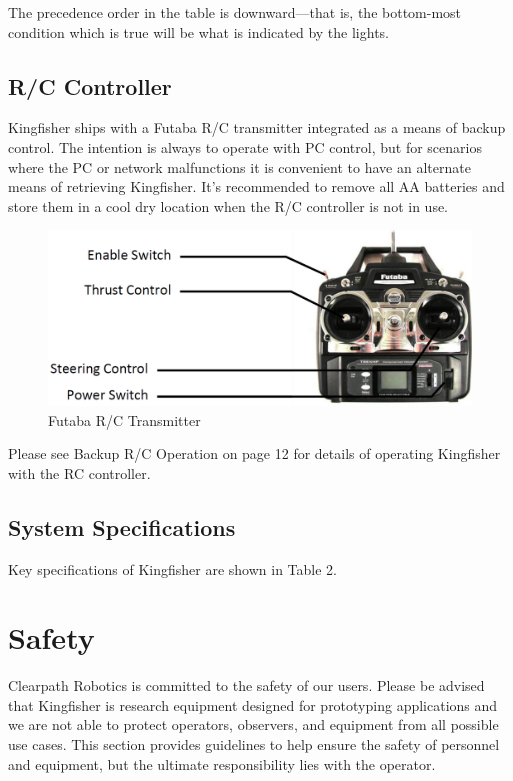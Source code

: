\documentclass[]{clearpath-latex/clearpath-manual}
\begin{document}
The precedence order in the table is downward—that is, the bottom-most condition which is true will be what is indicated by the lights.

\subsection{R/C Controller}
Kingfisher ships with a Futaba R/C transmitter integrated as a means of backup control. The intention is always to operate with PC control, but for scenarios where the PC or network malfunctions it is convenient to have an alternate means of retrieving Kingfisher. It’s recommended to remove all AA batteries and store them in a cool dry location when the R/C controller is not in use.

\begin{figure}[h]
  \centering
  \includegraphics[width=0.75\linewidth]{kf_futaba.PNG}
  \caption{Futaba R/C Transmitter}
  \label{kf_futaba}
\end{figure}
Please see Backup R/C Operation on page 12 for details of operating Kingfisher with the RC controller.
\newpage

\subsection{System Specifications}
Key specifications of Kingfisher are shown in Table 2.


\newpage

\section{Safety}
Clearpath Robotics is committed to the safety of our users. Please be advised that Kingfisher is research equipment designed for prototyping applications and we are not able to protect operators, observers, and equipment from all possible use cases. This section provides guidelines to help ensure the safety of personnel and equipment, but the ultimate responsibility lies with the operator.
\end{document}
